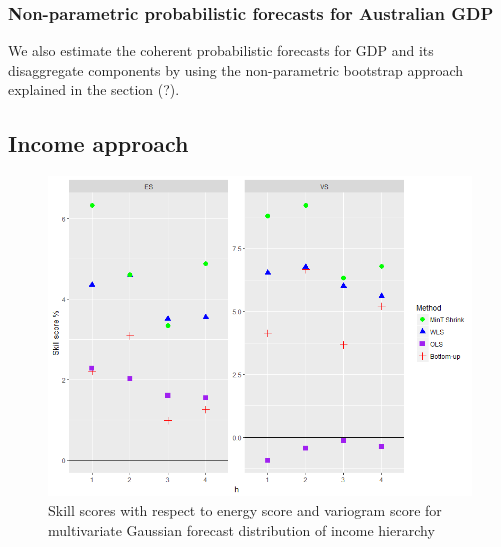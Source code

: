 \documentclass[graybox]{svmult}
\begin{document}
\subsubsection{Non-parametric probabilistic forecasts for Australian GDP}

We also estimate the coherent probabilistic forecasts for GDP and its disaggregate components by using the non-parametric bootstrap approach explained in the section (?).  

\subsection*{Income approach}

\begin{figure}[H]
	\centering
	\small
	\includegraphics[scale=0.50]{Figs/Results/INC-ProbNonParaF-MultivS_ES_VS.PNG}
	\caption{Skill scores with respect to energy score and variogram score for multivariate Gaussian forecast distribution of income hierarchy}\label{Inc_ProbNonParF_ES_VS}
\end{figure}
\end{document}
